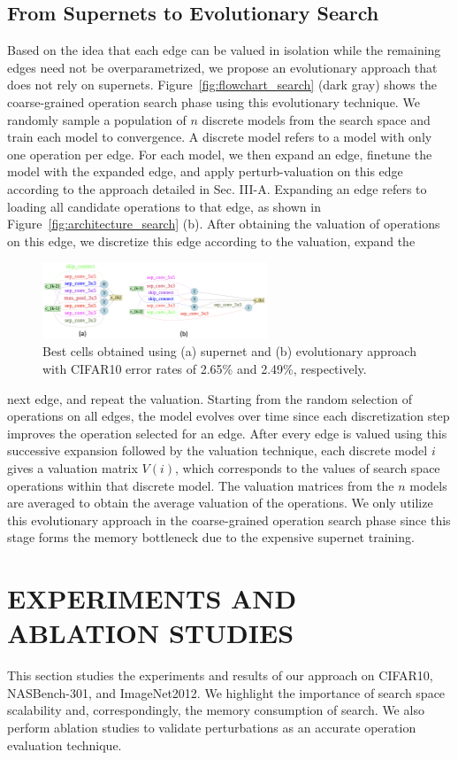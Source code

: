 \documentclass[onecolumn]{IEEEtran}
\begin{document}
\subsection{From Supernets to Evolutionary Search}
Based on the idea that each edge can be valued in isolation while the remaining edges need not be overparametrized, we propose an evolutionary approach that does not rely on supernets. Figure~\ref{fig:flowchart_search} (dark gray) shows the coarse-grained operation search phase using this evolutionary technique. We randomly sample a population of \( n \) discrete models from the search space and train each model to convergence. A discrete model refers to a model with only one operation per edge. For each model, we then expand an edge, finetune the model with the expanded edge, and apply perturb-valuation on this edge according to the approach detailed in Sec. III-A. Expanding an edge refers to loading all candidate operations to that edge, as shown in Figure~\ref{fig:architecture_search} (b). After obtaining the valuation of operations on this edge, we discretize this edge according to the valuation, expand the
\begin{figure}[ht]
	\centering
	\includegraphics[width=0.6\textwidth]{Figure-4.png}
	\caption{Best cells obtained using (a) supernet and (b) evolutionary approach with CIFAR10 error rates of 2.65\% and 2.49\%, respectively.}
	\label{fig:best_cells}
\end{figure}
next edge, and repeat the valuation. Starting from the random selection of operations on all edges, the model evolves over time since each discretization step improves the operation selected for an edge. After every edge is valued using this successive expansion followed by the valuation technique, each discrete model \( i \) gives a valuation matrix \( V(i) \), which corresponds to the values of search space operations within that discrete model. The valuation matrices from the \( n \) models are averaged to obtain the average valuation of the operations. We only utilize this evolutionary approach in the coarse-grained operation search phase since this stage forms the memory bottleneck due to the expensive supernet training.

\section{EXPERIMENTS AND ABLATION STUDIES}
This section studies the experiments and results of our approach on CIFAR10, NASBench-301, and ImageNet2012. We highlight the importance of search space scalability and, correspondingly, the memory consumption of search. We also perform ablation studies to validate perturbations as an accurate operation evaluation technique.
\end{document}
